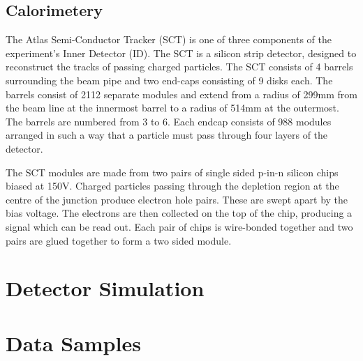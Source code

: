 \subsection{Calorimetery}

\label{sec:Detector-SCT}

The Atlas Semi-Conductor Tracker (SCT) is one of three components of the experiment's Inner Detector (ID). The SCT is a silicon strip detector, designed to reconstruct the tracks of passing charged particles. The SCT consists of 4 barrels surrounding the beam pipe and two end-caps consisting of 9 disks each. The barrels consist of 2112 separate modules and extend from a radius of 299mm from the beam line at the innermost barrel to a radius of 514mm at the outermost. The barrels are numbered from 3 to 6. Each endcap consists of 988 modules arranged in such a way that a particle must pass through four layers of the detector.

The SCT modules are made from two pairs of single sided p-in-n silicon chips biased at 150V. Charged particles passing through the depletion region at the centre of the junction produce electron hole pairs. These are swept apart by the bias voltage. The electrons are then collected on the top of the chip, producing a signal which can be read out. Each pair of chips is wire-bonded together and two pairs are glued together to form a two sided module.

\section{Detector Simulation}
\section{Data Samples}
